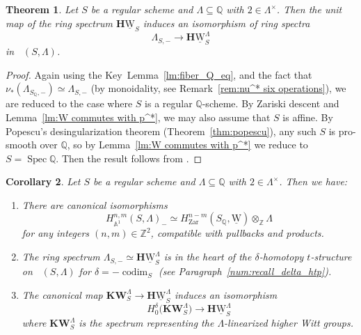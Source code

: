 \documentclass[11pt]{article}
\numberwithin{equation}{section}\renewcommand{\encodingdefault}{TU}
\newcommand{\tstructure}{$t$-structure\xspace}
\renewcommand{\AA}{\mathbb A}
\newcommand{\KW}{\mathbf{KW}}
\newcommand{\uW}{\underline{\mathrm W}}
\newcommand{\HuW}{\mathbf H \underline{\mathrm W}}
\DeclareMathOperator{\codim}{codim}
\DeclareMathOperator{\DA}{D_{\AA^1}}
\DeclareMathOperator{\spec}{Spec}
\newcommand{\ZZ} {\mathbb Z}
\newcommand{\QQ} {\mathbb Q}
\newcommand{\zar}{\mathrm{Zar}}
\newtheorem{thm}{Theorem}[section]
\newtheorem{cor}[thm]{Corollary}
\theoremstyle{remark}
\theoremstyle{definition}
\numberwithin{equation}{thm}
\begin{document}
\begin{thm}\label{thm:Witt motives}
Let $S$ be a regular scheme and $\Lambda \subseteq \QQ$ with $2 \in \Lambda^\times$.
Then the unit map of the ring spectrum $\HuW_S$ induces an isomorphism of ring spectra
\begin{equation*}\label{eq:W unit}
\Lambda_{S,-} \to \HuW^\Lambda_S
\end{equation*}
in $\DA(S, \Lambda)$.
\end{thm}
\begin{proof}
Again using the Key~Lemma~\ref{lm:fiber_Q_eq}, and the fact that $\nu_*(\Lambda_{S_\QQ,-}) \simeq \Lambda_{S,-}$ (by monoidality, see Remark~\ref{rem:nu^* six operations}), we are reduced to the case where $S$ is a regular $\QQ$\nobreakdash-scheme.
By Zariski descent \cite[2.3.8]{CD3} and Lemma~\ref{lm:W commutes with p^*}, we may also assume that $S$ is affine.
By Popescu's desingularization theorem (Theorem~\ref{thm:popescu}), any such $S$ is pro-smooth over $\QQ$, so by Lemma~\ref{lm:W commutes with p^*} we reduce to $S=\spec{\QQ}$.
Then the result follows from \cite[Prop.\,41]{Bachmann}.
\end{proof}

\pagebreak[2]
\begin{cor}\label{cor:comput_HA1minus}
Let $S$ be a regular scheme and $\Lambda \subseteq \QQ$ with $2 \in \Lambda^\times$.
Then we have:
\begin{enumerate}
\item
There are canonical isomorphisms
\[
H^{n,m}_{\AA^1}(S,\Lambda)_- \simeq H^{n-m}_\zar(S_\QQ,\uW) \otimes_\ZZ \Lambda
\]
for any integers $(n,m) \in \ZZ^2$, compatible with pullbacks and products.

\item
The ring spectrum $\Lambda_{S,-} \simeq \HuW_S^\Lambda$ is in the heart of the $\delta$-homotopy \tstructure on $\DA(S,\Lambda)$ for $\delta=-\codim_S$ (see Paragraph~\ref{num:recall_delta_htp}).

\item
The canonical map $\KW_S^\Lambda \to \HuW^\Lambda_S$ induces an isomorphism
\[
H_0^\delta\big(\KW_S^\Lambda\big) \to \HuW^\Lambda_S
\]
where $\KW_S^\Lambda$ is the spectrum representing the $\Lambda$-linearized higher Witt groups.
\end{enumerate}
\end{cor}
\end{document}

